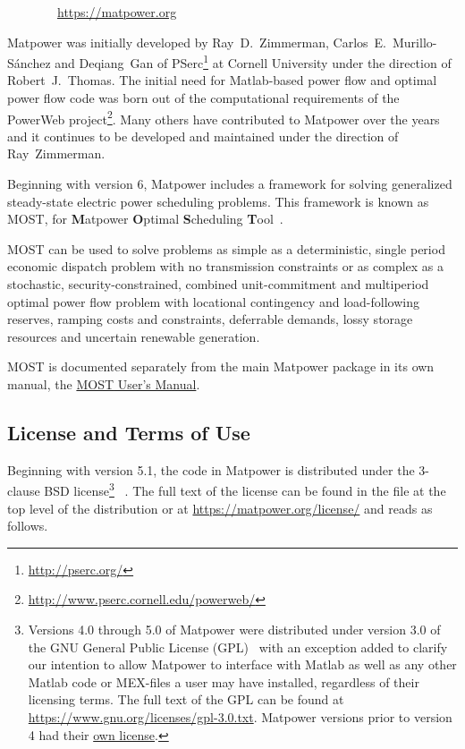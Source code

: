\documentclass[12pt]{article}
\newcommand{\matlab}[0]{{\sc Matlab}}
\newcommand{\matpower}[0]{{\sc Matpower}}
\newcommand{\matpowerurl}[0]{https://matpower.org}
\newcommand{\most}[0]{{MOST}}
\newcommand{\mostname}[0]{{{\bf M}{\sc atpower} \textbf{O}ptimal \textbf{S}cheduling \textbf{T}ool}}
\newcommand{\mostver}[0]{1.3}
\newcommand{\pserc}[0]{{\sc PSerc}}
\newcommand{\code}[1]{{\relsize{-0.5}{\tt{{#1}}}}}  %
\newcommand{\mostmanurl}[0]{https://matpower.org/docs/MOST-manual-\mostver.pdf}
\newcommand{\mostman}[0]{\href{\mostmanurl}{\most{} User's Manual}}
\numberwithin{equation}{section}
\numberwithin{table}{section}
\numberwithin{figure}{section}
\begin{document}
\bigskip

~~~~~~~~\url{\matpowerurl}

\bigskip

\matpower{} was initially developed by Ray~D.~Zimmerman, Carlos~E.~Murillo-S\'anchez and Deqiang~Gan of \pserc{}\footnote{\url{http://pserc.org/}} at Cornell University under the direction of Robert~J.~Thomas. The initial need for \matlab{}-based power flow and optimal power flow code was born out of the computational requirements of the PowerWeb project\footnote{\url{http://www.pserc.cornell.edu/powerweb/}}. Many others have contributed to \matpower{} over the years and it continues to be developed and maintained under the direction of Ray~Zimmerman.

Beginning with version 6, \matpower{} includes a framework for solving generalized steady-state electric power scheduling problems. This framework is known as \most{}, for \mostname{}~\cite{murillo-sanchez2013a,lamadrid2018}.

\most{} can be used to solve problems as simple as a deterministic, single period economic dispatch problem with no transmission constraints or as complex as a stochastic, security-constrained, combined unit-commitment and multiperiod optimal power flow problem with locational contingency and load-following reserves, ramping costs and constraints, deferrable demands, lossy storage resources and uncertain renewable generation.

\most{} is documented separately from the main \matpower{} package in its own manual, the \mostman{}.

\pagebreak
\subsection{License and Terms of Use}

Beginning with version 5.1, the code in \matpower{} is distributed under the 3-clause BSD license\footnote{Versions 4.0 through 5.0 of \matpower{} were distributed under version 3.0 of the GNU General Public License (GPL)~\cite{gpl} with an exception added to clarify our intention to allow \matpower{} to interface with \matlab{} as well as any other \matlab{} code or MEX-files a user may have installed, regardless of their licensing terms. The full text of the GPL can be found at \url{https://www.gnu.org/licenses/gpl-3.0.txt}. \matpower{} versions prior to version 4 had their \href{https://matpower.org/license/old}{own license}.}
~\cite{bsd}. The full text of the license can be found in the \code{LICENSE} file at the top level of the distribution or at \url{https://matpower.org/license/} and reads as follows.
\end{document}
